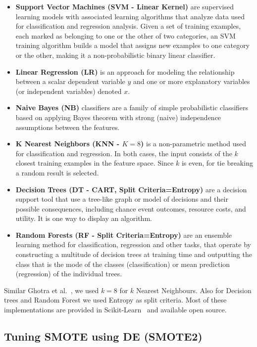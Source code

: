\documentclass[sigconf,review, anonymous]{acmart}
\newcommand{\bi}{\begin{itemize}[leftmargin=0.4cm]}
\newcommand{\ei}{\end{itemize}}
\theoremstyle{break}
\theoremstyle{break}
\begin{document}
\bi
 \item \textbf{Support Vector Machines (SVM - Linear Kernel)} are supervised learning models with associated learning algorithms that analyze data used for classification and regression analysis. Given a set of training examples, each marked as belonging to one or the other of two categories, an SVM training algorithm builds a model that assigns new examples to one category or the other, making it a non-probabilistic binary linear classifier.
 \item \textbf{Linear Regression (LR)} is an approach for modeling the relationship between a scalar dependent variable $y$ and one or more explanatory variables (or independent variables) denoted $x$.
 \item \textbf{Naive Bayes (NB)} classifiers are a family of simple probabilistic classifiers based on applying Bayes theorem with strong (naive) independence assumptions between the features.
 \item \textbf{K Nearest Neighbors (KNN - $K=8$)} is a non-parametric method used for classification and regression. In both cases, the input consists of the $k$ closest training examples in the feature space. Since $k$ is even, for tie breaking a random result is selected.
 \item \textbf{Decision Trees (DT - CART, Split Criteria=Entropy)} are a decision support tool that use a tree-like graph or model of decisions and their possible consequences, including chance event outcomes, resource costs, and utility. It is one way to display an algorithm.
 \item \textbf{Random Forests (RF - Split Criteria=Entropy)} are an ensemble learning method for classification, regression and other tasks, that operate by constructing a multitude of decision trees at training time and outputting the class that is the mode of the classes (classification) or mean prediction (regression) of the individual trees. 
\ei

Similar Ghotra et al.~\cite{ghotra2015revisiting}, we used $k=8$ for $k$ Nearest Neighbours. Also for Decision trees and Random Forest we used Entropy as split criteria. Most of these implementations are provided in Scikit-Learn~\cite{pedregosa2011scikit} and available open source.

\subsection{\textbf{Tuning SMOTE using DE (SMOTE2)}}
\label{sect:tuning}
\end{document}
